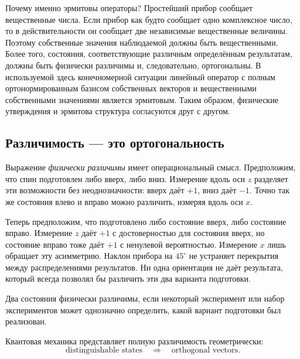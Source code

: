 Почему именно эрмитовы операторы? Простейший прибор сообщает вещественные числа. Если прибор как будто сообщает одно комплексное число, то в действительности он сообщает две независимые вещественные величины. Поэтому собственные значения наблюдаемой должны быть вещественными. Более того, состояния, соответствующие различным определённым результатам, должны быть физически различимы и, следовательно, ортогональны. В используемой здесь конечномерной ситуации линейный оператор с полным ортонормированным базисом собственных векторов и вещественными собственными значениями является эрмитовым. Таким образом, физические утверждения и эрмитова структура согласуются друг с другом.

\subsection{Различимость — это ортогональность}

Выражение \emph{физически различимы} имеет операциональный смысл. Предположим, что спин подготовлен либо вверх, либо вниз. Измерение вдоль оси \(z\) разделяет эти возможности без неоднозначности: вверх даёт \(+1\), вниз даёт \(-1\). Точно так же состояния влево и вправо можно различить, измеряя вдоль оси \(x\).

Теперь предположим, что подготовлено либо состояние вверх, либо состояние вправо. Измерение \(z\) даёт \(+1\) с достоверностью для состояния вверх, но состояние вправо тоже даёт \(+1\) с ненулевой вероятностью. Измерение \(x\) лишь обращает эту асимметрию. Наклон прибора на \(45^\circ\) не устраняет перекрытия между распределениями результатов. Ни одна ориентация не даёт результата, который всегда позволял бы различить эти два варианта подготовки.

\begin{definition}
Два состояния физически различимы, если некоторый эксперимент или набор экспериментов может однозначно определить, какой вариант подготовки был реализован.
\end{definition}

Квантовая механика представляет полную различимость геометрически:
\begin{equation}
\text{distinguishable states}
\quad\Longrightarrow\quad
\text{orthogonal vectors}.
\end{equation}

\begin{classroomqa}
\end{classroomqa}

